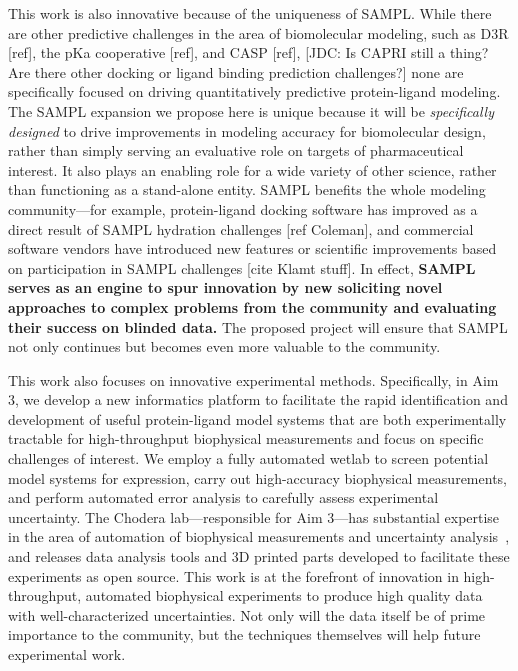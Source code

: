 \documentclass[11pt]{article}
\begin{document}
This work is also innovative because of the uniqueness of SAMPL.
While there are other predictive challenges in the area of biomolecular modeling, such as D3R [ref], the pKa cooperative [ref], and CASP [ref],
{\color{red}[JDC: Is CAPRI still a thing? Are there other docking or ligand binding prediction challenges?]}
none are specifically focused on driving quantitatively predictive protein-ligand modeling.
The SAMPL expansion we propose here is unique because it will be \emph{specifically designed} to drive improvements in modeling accuracy for biomolecular design, rather than simply serving an evaluative role on targets of pharmaceutical interest.
It also plays an enabling role for a wide variety of other science, rather than functioning as a stand-alone entity. 
SAMPL benefits the whole modeling community---for example, protein-ligand docking software has improved as a direct result of SAMPL hydration challenges [ref Coleman], and commercial software vendors have introduced new features or scientific improvements based on participation in SAMPL challenges [cite Klamt stuff].
In effect, {\bf SAMPL serves as an engine to spur innovation by new soliciting novel approaches to complex problems from the community and evaluating their success on blinded data.}
The proposed project will ensure that SAMPL not only continues but becomes even more valuable to the community.
 

This work also focuses on innovative experimental methods.
Specifically, in Aim 3, we develop a new informatics platform to facilitate the rapid identification and development of useful protein-ligand model systems that are both experimentally tractable for high-throughput biophysical measurements and focus on specific challenges of interest.
We employ a fully automated wetlab to screen potential model systems for expression, carry out high-accuracy biophysical measurements, and perform automated error analysis to carefully assess experimental uncertainty.
The Chodera lab---responsible for Aim 3---has substantial expertise in the area of automation of biophysical measurements and uncertainty analysis~\cite{Hanson:2015:JournalofComputer-AidedMolecularDesign}, and releases data analysis tools and 3D printed parts developed to facilitate these experiments as open source. 
This work is at the forefront of innovation in high-throughput, automated biophysical experiments to produce high quality data with well-characterized uncertainties. 
Not only will the data itself be of prime importance to the community, but the techniques themselves will help future experimental work.
\end{document}
